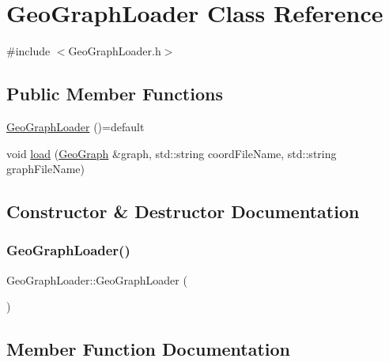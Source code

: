 \hypertarget{class_geo_graph_loader}{}\section{Geo\+Graph\+Loader Class Reference}
\label{class_geo_graph_loader}


{\ttfamily \#include $<$Geo\+Graph\+Loader.\+h$>$}

\subsection*{Public Member Functions}
\begin{DoxyCompactItemize}
\item 
\mbox{\hyperlink{class_geo_graph_loader_a5f5026324107a8954af84df6e2fb41b2}{Geo\+Graph\+Loader}} ()=default
\item 
void \mbox{\hyperlink{class_geo_graph_loader_a73e35e4ac2d20e160a9d17345ded9724}{load}} (\mbox{\hyperlink{class_geo_graph}{Geo\+Graph}} \&graph, std\+::string coord\+File\+Name, std\+::string graph\+File\+Name)
\end{DoxyCompactItemize}


\subsection{Constructor \& Destructor Documentation}
\mbox{\label{class_geo_graph_loader_a5f5026324107a8954af84df6e2fb41b2}} 
\subsubsection{\texorpdfstring{GeoGraphLoader()}{GeoGraphLoader()}}
{\footnotesize\ttfamily Geo\+Graph\+Loader\+::\+Geo\+Graph\+Loader (\begin{DoxyParamCaption}{ }\end{DoxyParamCaption})\hspace{0.3cm}{\ttfamily [default]}}



\subsection{Member Function Documentation}
\mbox{\label{class_geo_graph_loader_a73e35e4ac2d20e160a9d17345ded9724}} 
